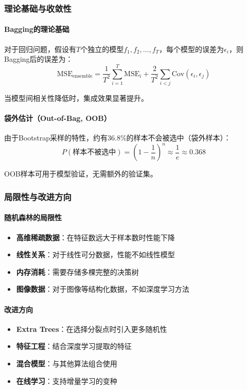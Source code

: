 \documentclass[UTF8]{report}
\theoremstyle{MyLineTheoremStyle} %
\theoremstyle{MyBlockTheoremStyle} %
\theoremstyle{MySubsubsectionStyle} %
\begin{document}
\subsubsection{理论基础与收敛性}

\paragraph{Bagging的理论基础}
对于回归问题，假设有$T$个独立的模型$f_1, f_2, \ldots, f_T$，每个模型的误差为$\epsilon_i$，则Bagging后的误差为：
\begin{equation}
\text{MSE}_{\text{ensemble}} = \frac{1}{T^2} \sum_{i=1}^{T} \text{MSE}_i + \frac{2}{T^2} \sum_{i<j} \text{Cov}(\epsilon_i, \epsilon_j)
\end{equation}

当模型间相关性降低时，集成效果显著提升。

\paragraph{袋外估计（Out-of-Bag, OOB）}
由于Bootstrap采样的特性，约有36.8\%的样本不会被选中（袋外样本）：
\begin{equation}
P(\text{样本不被选中}) = \left(1 - \frac{1}{n}\right)^n \approx \frac{1}{e} \approx 0.368
\end{equation}

OOB样本可用于模型验证，无需额外的验证集。



\subsubsection{局限性与改进方向}

\paragraph{随机森林的局限性}
\begin{itemize}
    \item \textbf{高维稀疏数据}：在特征数远大于样本数时性能下降
    \item \textbf{线性关系}：对于线性可分数据，性能不如线性模型
    \item \textbf{内存消耗}：需要存储多棵完整的决策树
    \item \textbf{图像数据}：对于图像等结构化数据，不如深度学习方法
\end{itemize}

\paragraph{改进方向}
\begin{itemize}
    \item \textbf{Extra Trees}：在选择分裂点时引入更多随机性
    \item \textbf{特征工程}：结合深度学习提取的特征
    \item \textbf{混合模型}：与其他算法组合使用
    \item \textbf{在线学习}：支持增量学习的变种
\end{itemize}
\end{document}
